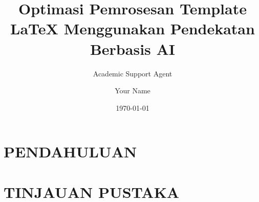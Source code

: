\documentclass{article}
\title{Optimasi Pemrosesan Template LaTeX Menggunakan Pendekatan Berbasis AI}
\author{Academic Support Agent}
\date{\today}
\begin{document}
\maketitle

\begin{abstract}

\end{abstract}

\chapter{PENDAHULUAN}


\chapter{TINJAUAN PUSTAKA}






\author{Your Name}
\end{document}
